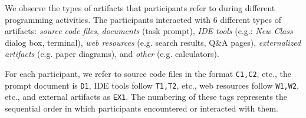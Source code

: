We observe the types of artifacts that participants refer to during different programming activities. The participants interacted with 6 different types of artifacts: \textit{source code files}, \textit{documents} (task prompt), \textit{IDE tools} (e.g.: \textit{New Class} dialog box, terminal), \textit{web resources} (e.g. search results, Q\&A pages), \textit{externalized artifacts} (e.g. paper diagrams), and \textit{other} (e.g. calculators).

For each participant, we refer to source code files in the format \texttt{C1,C2}, etc., the prompt document is \texttt{D1}, IDE tools follow \texttt{T1,T2}, etc., web resources follow \texttt{W1,W2}, etc., and external artifacts as \texttt{EX1}. The numbering of these tags represents the sequential order in which participants encountered or interacted with them.






